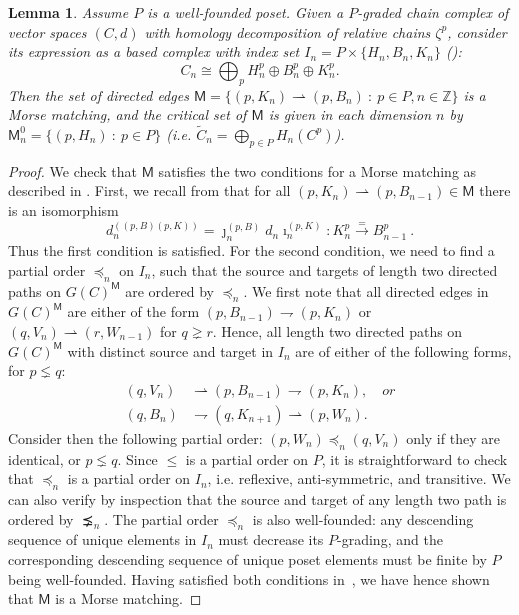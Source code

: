 \documentclass[11pt, table, nothms]{amsart}
\newtheorem{lemma}[theorem]{Lemma}
\theoremstyle{definition}
\newcommand{\qc}{,\quad}
\newcommand{\Z}{\mathbb{Z}}
\newcommand{\sM}{\mathsf{M}}
\begin{document}
{\begin{lemma} \label{lem:morse_matching_connection_matrix}
    Assume $P$ is a well-founded poset. Given a $P$-graded chain complex of vector spaces $(C,d)$ with homology decomposition of relative chains $\zeta^p$, consider its expression as a based complex with index set $I_n = P \times \{H_n, B_n,K_n\}$ ():
    \[C_n \cong \bigoplus_p H^p_n \oplus B^p_n \oplus K^p_n.\]
    Then the set of directed edges $\sM = \{(p,K_n) \rightharpoonup (p, B_n) \ : \ p \in P, n \in \Z\}$ is a Morse matching, and the critical set of $\sM$ is given in each dimension $n$ by $\sM^0_n = \{ (p,H_n) \ : \ p \in P\}$ (i.e. $\widetilde{C}_n = \bigoplus_{p \in P} H_n(C^p)$). 
\end{lemma}
\begin{proof}
We check that $\sM$ satisfies the two conditions for a Morse matching as described in . 
First, we recall from  that for all $(p,K_n) \rightharpoonup (p, B_{n-1}) \in \sM$ there is an isomorphism
\[
d^{((p,B)(p,K))}_n = \jmath^{(p,B)}_n d_n \imath^{(p,K)}_n: K_n^p \xrightarrow{=} B^p_{n-1}  \ .
\]
Thus the first condition is satisfied. 
For the second condition, we need to find a partial order $\preceq_n$ on $I_n$, such that the source and targets of length two directed paths on $G(C)^\sM$ are ordered by $\preceq_n$. We first note that all directed edges in $G(C)^\sM$ are either of the form $(p, B_{n-1})\rightharpoondown (p,K_n)$ or $(q,V_n) \rightharpoonup (r,W_{n-1})$ for $q\gneq r$. Hence, all length two directed paths on $G(C)^\sM$ with distinct source and target in $I_n$ are of either of the following forms, for $p \lneq q$:
\begin{align*}
    (q, V_n) &\rightharpoonup (p, B_{n-1}) \rightharpoondown (p, K_{n}) \qc{or}\\
    (q, B_n) &\rightharpoondown (q, K_{n+1}) \rightharpoonup (p, W_{n}).
\end{align*}
Consider then the following partial order: $(p, W_n) \preceq_n (q,V_n)$ only if they are identical, or $p \lneq q$.
Since $\leq$ is a partial order on $P$, it is straightforward to check that $\preceq_n$ is a partial order on $I_n$, i.e. reflexive, anti-symmetric, and transitive. We can also verify by inspection that the source and target of any length two path is ordered by $\precneq_n$. The partial order $\preceq_n$ is also well-founded: any descending sequence of unique elements in $I_n$ must decrease its $P$-grading, and the corresponding descending sequence of unique poset elements must be finite by $P$ being well-founded. Having satisfied both conditions in~, we have hence shown that $\sM$ is a Morse matching.


\end{proof}}
\end{document}
